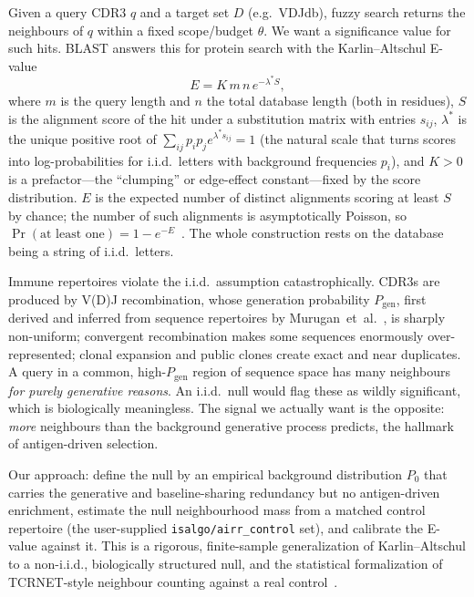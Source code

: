 \documentclass[11pt]{article}
\theoremstyle{oldplain}
\theoremstyle{oldrem}
\newcommand{\Pgen}{P_{\mathrm{gen}}}
\newcommand{\Pzero}{P_{0}}
\begin{document}
Given a query CDR3 $q$ and a target set $D$ (e.g.\ VDJdb), fuzzy search returns the neighbours of
$q$ within a fixed scope/budget $\theta$. We want a significance value for such hits. BLAST answers
this for protein search with the Karlin--Altschul E-value
\begin{equation}\label{eq:ka}
  E = K\,m\,n\,e^{-\lambda^\ast S},
\end{equation}
where $m$ is the query length and $n$ the total database length (both in residues), $S$ is the
alignment score of the hit under a substitution matrix with entries $s_{ij}$, $\lambda^\ast$ is the
unique positive root of $\sum_{ij} p_i p_j e^{\lambda^\ast s_{ij}} = 1$ (the natural scale that turns
scores into log-probabilities for i.i.d.\ letters with background frequencies $p_i$), and $K>0$ is a
prefactor---the ``clumping'' or edge-effect constant---fixed by the score distribution. $E$ is the
expected number of distinct alignments scoring at least $S$ by chance; the number of such alignments
is asymptotically Poisson, so $\Pr(\text{at least one}) = 1-e^{-E}$~\cite{Karlin1990,Karlin1993}.
The whole construction rests on the database being a string of i.i.d.\ letters.

Immune repertoires violate the i.i.d.\ assumption catastrophically. CDR3s are produced by V(D)J
recombination, whose generation probability $\Pgen$, first derived and inferred from sequence
repertoires by Murugan~et~al.~\cite{Murugan2012}, is sharply non-uniform; convergent recombination
makes some sequences enormously over-represented; clonal
expansion and public clones create exact and near duplicates. A query in a common, high-$\Pgen$
region of sequence space has many neighbours \emph{for purely generative reasons}. An i.i.d.\ null
would flag these as wildly significant, which is biologically meaningless. The signal we actually
want is the opposite: \emph{more} neighbours than the background generative process predicts, the
hallmark of antigen-driven selection.

Our approach: define the null by an empirical background distribution $\Pzero$ that carries the
generative and baseline-sharing redundancy but no antigen-driven enrichment, estimate the
null neighbourhood mass from a matched control repertoire (the user-supplied
\texttt{isalgo/airr\_control} set), and calibrate the E-value against it. This is a rigorous,
finite-sample generalization of Karlin--Altschul to a non-i.i.d., biologically structured null, and
the statistical formalization of TCRNET-style neighbour counting against a real
control~\cite{Ritvo2018,Pogorelyy2019}.
\end{document}
